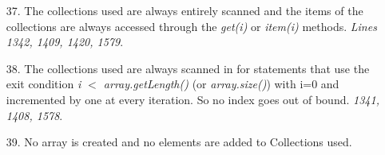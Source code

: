 \begin{itemize}
\item [37.] The collections used are always entirely scanned and the items of the collections are always accessed through the \textit{get(i)} or \textit{item(i)} methods. \textit{Lines 1342, 1409, 1420, 1579}.
\item [38.] The collections used are always scanned in for statements that use the exit condition \textit{i $<$ array.getLength()} (or \textit{array.size()}) with i=0 and incremented by one at every iteration. So no index goes out of bound. \textit{1341, 1408, 1578}.
\item [39.] No array is created and no elements are added to Collections used.
\end{itemize}
    